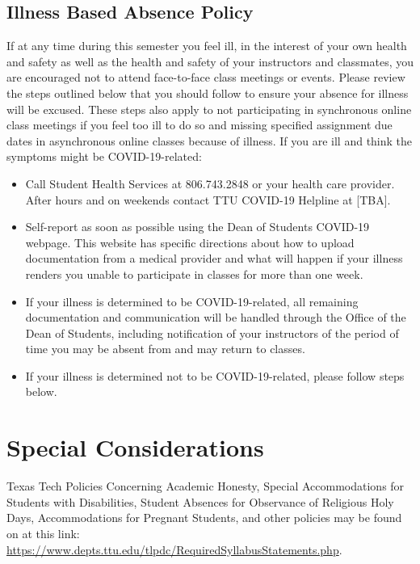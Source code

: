 \documentclass[12pt, notitlepage]{article}   	%
\begin{document}
{\subsection{Illness Based Absence Policy}
If at any time during this semester you feel ill, in the interest of your own health and 
safety as well as the health and safety of your instructors and classmates, you are 
encouraged not to attend face-to-face class meetings or events.  Please review the steps 
outlined below that you should follow to ensure your absence for illness will be excused. 
These steps also apply to not participating in synchronous online class meetings if you feel 
too ill to do so and missing specified assignment due dates in asynchronous online classes 
because of illness. If you are ill and think the symptoms might be COVID-19-related:
\begin{itemize}
	\item{Call Student Health Services at 806.743.2848 or your health care provider.  
	After hours and on weekends contact TTU COVID-19 Helpline at [TBA].}
	\item{Self-report as soon as possible using the Dean of Students COVID-19 webpage.
	This website has specific directions about how to upload documentation from a medical 
	provider and what will happen if your illness renders you unable to participate in 
	classes for more than one week.}
	\item{If your illness is determined to be COVID-19-related, all remaining 
	documentation and communication will be handled through the Office of the 
	Dean of Students, including notification of your instructors of the period of 
	time you may be absent from and may return to classes.}
	\item{If your illness is determined not to be COVID-19-related, please follow steps below.}
\end{itemize}

\section{Special Considerations}
Texas Tech Policies Concerning Academic Honesty, Special Accommodations for Students with 
Disabilities, Student Absences for Observance of Religious Holy Days, Accommodations for 
Pregnant Students, and other policies may be found on at this link: 
\url{https://www.depts.ttu.edu/tlpdc/RequiredSyllabusStatements.php}.

}
\end{document}
